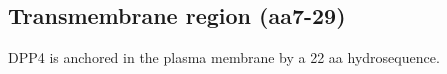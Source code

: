 \subsection{Transmembrane region (aa7-29)}

DPP4 is anchored in the plasma membrane by a 22 aa hydrosequence. 